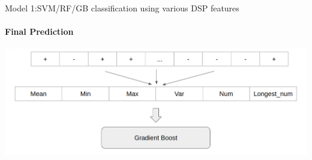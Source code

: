 \documentclass{beamer}
\begin{document}
\begin{frame}{Model 1:SVM/RF/GB classification using various DSP features}
  \framesubtitle{Final Prediction}
  \begin{center}
  \includegraphics[scale=0.2]{img/window.png}
  \end{center}
\end{frame}
\end{document}
